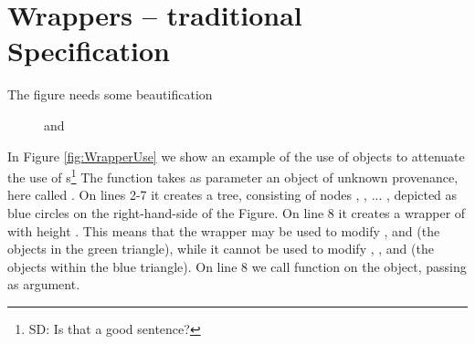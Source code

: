 \section{Wrappers -- traditional Specification}

The figure needs some beautification

\begin{figure}[htb]
 \vspace*{-7mm}
\caption{  and  }
\label{fig:DOM}
\end{figure}

In Figure \ref{fig:WrapperUse} we show an example of the use of   objects to attenuate the use of s\footnote{SD: Is that a good sentence?}  The function  takes as parameter an object of unknown provenance, here called . On lines 2-7 it creates a tree, consisting of nodes , , ... , depicted as blue circles on the   right-hand-side of the Figure. On line 8 it creates a wrapper of  with height . This means that the wrapper  may be used to modify ,  and  (\ie the objects in the green triangle), while it cannot be used to modify , , and  (\ie the objects within the blue triangle). 
On line 8 we call   function  on the  object, passing  as   argument. 

